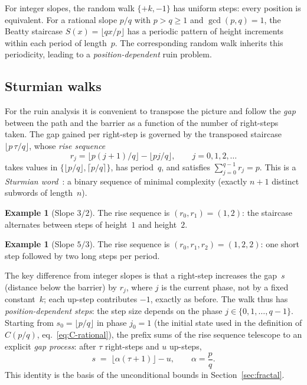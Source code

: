 \documentclass[11pt]{article}
\theoremstyle{definition}
\newtheorem{example}[theorem]{Example}
\theoremstyle{remark}
\newcommand{\floor}[1]{\lfloor #1 \rfloor}
\newcommand{\ceil}[1]{\lceil #1 \rceil}
\begin{document}
For integer slopes, the random walk $\{+k, -1\}$ has uniform steps:
every position is equivalent.
For a rational slope $p/q$ with $p > q \geq 1$ and $\gcd(p, q) = 1$,
the Beatty staircase $S(x) = \floor{qx/p}$ has a periodic pattern
of height increments within each period of length~$p$.
The corresponding random walk inherits this periodicity, leading to a
\emph{position-dependent} ruin problem.

\subsection{Sturmian walks}

For the ruin analysis it is convenient to transpose the picture and
follow the \emph{gap} between the path and the barrier as a function
of the number of right-steps taken.
The gap gained per right-step is governed by the transposed staircase
$\floor{p\,\tau/q}$, whose \emph{rise sequence}
\[
r_j = \floor{p(j+1)/q} - \floor{pj/q},
\qquad j = 0, 1, 2, \ldots
\]
takes values in $\{\floor{p/q}, \ceil{p/q}\}$, has period~$q$,
and satisfies $\sum_{j=0}^{q-1} r_j = p$.
This is a \emph{Sturmian word}~\cite{Lothaire2002}: a binary sequence
of minimal complexity (exactly $n+1$ distinct subwords of length~$n$).

\begin{example}[Slope $3/2$]
The rise sequence is $(r_0, r_1) = (1, 2)$: the staircase alternates
between steps of height~$1$ and height~$2$.
\end{example}

\begin{example}[Slope $5/3$]
The rise sequence is $(r_0, r_1, r_2) = (1, 2, 2)$: one short step
followed by two long steps per period.
\end{example}

The key difference from integer slopes is that a right-step
increases the gap~$s$ (distance below the barrier) by $r_j$, where
$j$ is the current phase, not by a fixed constant~$k$; each up-step
contributes $-1$, exactly as before.
The walk thus has \emph{position-dependent steps}: the step size
depends on the phase $j \in \{0, 1, \ldots, q-1\}$.
Starting from $s_0 = \floor{p/q}$ in phase $j_0 = 1$ (the initial
state used in the definition of $C(p/q)$,
eq.~\eqref{eq:C-rational}), the prefix sums of the rise sequence
telescope to an explicit \emph{gap process}: after $\tau$
right-steps and $u$ up-steps,
\begin{equation}\label{eq:gap-process}
  s \;=\; \floor{\alpha(\tau + 1)} - u,
  \qquad \alpha = \frac{p}{q}.
\end{equation}
This identity is the basis of the unconditional bounds in
Section~\ref{sec:fractal}.
\end{document}
